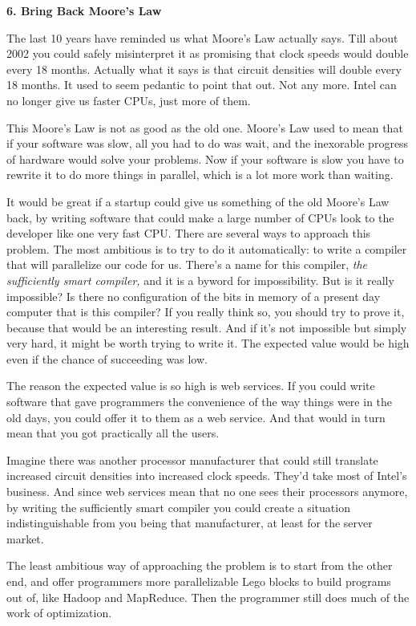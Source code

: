 \documentclass[12pt]{book}
\begin{document}
\textbf{6. Bring Back Moore's Law}

The last 10 years have reminded us what Moore's Law actually says. Till
about 2002 you could safely misinterpret it as promising that clock
speeds would double every 18 months. Actually what it says is that
circuit densities will double every 18 months. It used to seem pedantic
to point that out. Not any more. Intel can no longer give us faster
CPUs, just more of them.

This Moore's Law is not as good as the old one. Moore's Law used to mean
that if your software was slow, all you had to do was wait, and the
inexorable progress of hardware would solve your problems. Now if your
software is slow you have to rewrite it to do more things in parallel,
which is a lot more work than waiting.

It would be great if a startup could give us something of the old
Moore's Law back, by writing software that could make a large number of
CPUs look to the developer like one very fast CPU. There are several
ways to approach this problem. The most ambitious is to try to do it
automatically: to write a compiler that will parallelize our code for
us. There's a name for this compiler, \emph{the sufficiently smart
compiler,} and it is a byword for impossibility. But is it really
impossible? Is there no configuration of the bits in memory of a present
day computer that is this compiler? If you really think so, you should
try to prove it, because that would be an interesting result. And if
it's not impossible but simply very hard, it might be worth trying to
write it. The expected value would be high even if the chance of
succeeding was low.

The reason the expected value is so high is web services. If you could
write software that gave programmers the convenience of the way things
were in the old days, you could offer it to them as a web service. And
that would in turn mean that you got practically all the users.

Imagine there was another processor manufacturer that could still
translate increased circuit densities into increased clock speeds.
They'd take most of Intel's business. And since web services mean that
no one sees their processors anymore, by writing the sufficiently smart
compiler you could create a situation indistinguishable from you being
that manufacturer, at least for the server market.

The least ambitious way of approaching the problem is to start from the
other end, and offer programmers more parallelizable Lego blocks to
build programs out of, like Hadoop and MapReduce. Then the programmer
still does much of the work of optimization.
\end{document}
